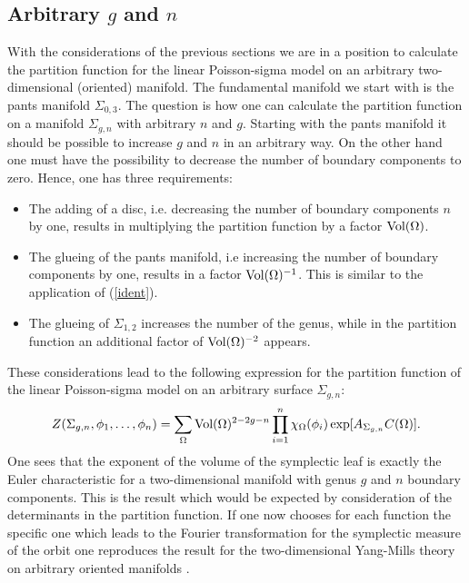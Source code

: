 \documentclass[a4paper,twoside,11pt]{article}
\numberwithin{equation}{section}
\begin{document}
\subsection{Arbitrary $g$ and $n$}
%
With the considerations of the previous sections we are in a position to calculate the partition function 
for the linear Poisson-sigma model on an arbitrary two-dimensional (oriented) manifold. The fundamental 
manifold we start with is the pants manifold $\Sigma_{0,3}$. The question is how one can calculate the 
partition function on a manifold $\Sigma_{g,n}$ with arbitrary $n$ and $g$. Starting with the pants manifold it 
should be possible to increase $g$ and $n$ in an arbitrary way. On the other hand one must have the possibility 
to decrease the number of boundary components to zero. Hence, one has three requirements:
\begin{itemize}
\item The adding of a disc, i.e. decreasing the number of boundary components $n$ by one, results in multiplying the 
partition function by a factor  $\text{Vol}(\Omega)$.
\item The glueing of the pants manifold, i.e increasing the number of boundary components by one, results in a factor 
 $\text{Vol}(\Omega)^{-1}$. This is similar to the application of (\ref{ident}).
\item The glueing of $\Sigma_{1,2}$ increases the number of the genus, while in the partition function 
an additional factor of $\text{Vol}(\Omega)^{-2}$ appears.
\end{itemize}
These considerations lead to the following expression for the partition function of the linear 
Poisson-sigma model on an arbitrary surface $\Sigma_{g,n}$:
\begin{gather}
Z(\Sigma_{g,n},\phi_1,\ldots,\phi_n)=\sum_\Omega\text{Vol}(\Omega)^{2-2g-n}\prod_{i=1}^n\chi_\Omega(\phi_i)
\exp[A_{\Sigma_{g,n}}C(\Omega)].
\end{gather}
One sees that the exponent of the volume of the symplectic leaf is exactly the Euler characteristic for 
a two-dimensional manifold with genus $g$ and $n$ boundary components. This is the result which would be expected by consideration of the determinants in the partition function.
If one now chooses for each function the specific one which leads to the Fourier transformation 
for the symplectic measure of the orbit one reproduces the result for the two-dimensional Yang-Mills 
theory on arbitrary oriented manifolds \cite{BT}.
%
%
\end{document}
